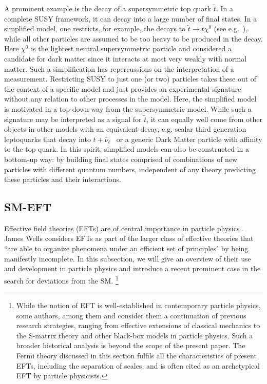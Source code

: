 A prominent example is the decay of a supersymmetric top quark
$\tilde{t}$. In a complete SUSY framework, it can decay into a large
number of final states.  In a simplified model, one restricts, for example, the
decays to $\tilde{t}\rightarrow t\chi^0$ (see e.g.~\cite{Aaboud:2017ayj}), while all other particles
are assumed to be too heavy to be produced in the decay.  
Here $\chi^0$ is the lightest neutral supersymmetric particle and considered a candidate for 
dark matter since it interacts at most very weakly with normal matter.  
Such a
simplification has repercussions on the interpretation of a
measurement.  Restricting SUSY to just one (or two) particles takes
these out of the context of a specific model and just provides an
experimental signature without any relation to other processes in the
model. Here, the simplified model is motivated in a top-down way from
the supersymmetric model. While such a signature may be interpreted as a signal for
$\tilde{t}$, it can equally well come from other objects in other
models with an equivalent decay, e.g. scalar third generation
leptoquarks that decay into $t+\bar{\nu}_t$~\citep{Aad:2015caa} or a generic Dark Matter particle with affinity to the
top quark. In this spirit, simplified models can also be constructed
in a bottom-up way: by building final states comprised of
combinations of new particles with different quantum numbers,
independent of any theory predicting these particles and their interactions.



\subsection{SM-EFT}

Effective field theories (EFTs) are of central importance in particle
physics \citep[see, e.g.,][]{Georgi:1994qn}. James Wells considers EFTs as part of the larger class of effective theories that ``are able to organize phenomena under an efficient set of principles" \citep[p.~1]{wells2012} by being manifestly incomplete.
In this subsection, we will give an overview of their use and development in particle physics and introduce a recent prominent case in the search for deviations from the SM.
\footnote{While the notion of EFT is well-established in contemporary particle physics, some authors, among them \citet{wells2012} and \citet{Rivat2020-RIVPFO} consider them a continuation of previous research strategies, ranging from effective extensions of classical mechanics to the S-matrix theory and other black-box models in particle physics. Such a broader historical analysis is beyond the scope of the present paper. The Fermi theory discussed in this section fulfils all the characteristics of present EFTs, including the separation of scales, and is often cited as an archetypical EFT by particle physicists.}


